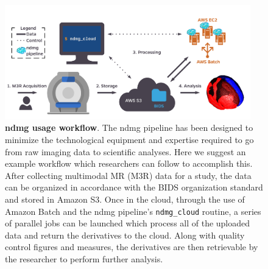 \documentclass[simplex.tex]{subfiles}
\begin{document}
\begin{figure}[h!]
\begin{cframed}
\centering
\includegraphics[width=0.95\textwidth]{../../figs/ndmgcloud.pdf}
\caption{\textbf{ndmg usage workflow}. The ndmg pipeline has been designed to minimize the technological equipment and
expertise required to go from raw imaging data to scientific analyses. Here we suggest an example workflow which
researchers can follow to accomplish this. After collecting multimodal MR (M3R) data for a study, the data can be
organized in accordance with the BIDS organization standard and stored in Amazon S3. Once in the cloud, through the use
of Amazon Batch and the ndmg pipeline's \texttt{ndmg\_cloud} routine, a series of parallel jobs can be launched which
process all of the uploaded data and return the derivatives to the cloud. Along with quality control figures and
measures, the derivatives are then retrievable by the researcher to perform further analysis.}
\label{fig:ndmgcloud}
\end{cframed}
\end{figure}
\end{document}
